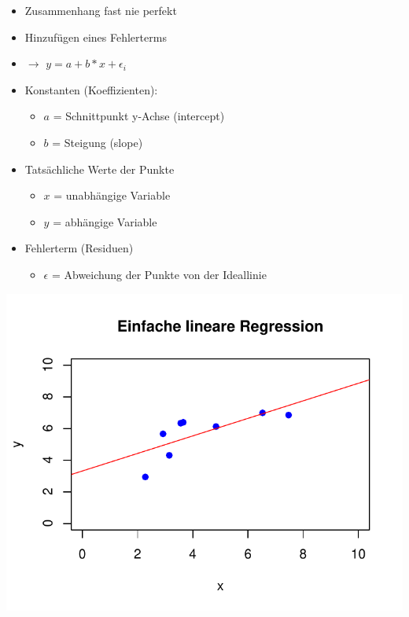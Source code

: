 \documentclass[aspectratio=169, journal, x11names, unknownkeysallowed, hyperref={colorlinks,
linkcolor = SS2,
urlcolor  = F3,
citecolor = F3,
anchorcolor = A4}, 12pt]{beamer}
\newcommand{\oarrow}{\textcolor{A1}{$\rightarrow$} }
\begin{document}
\begin{frame}[t]
  \begin{minipage}[t]{0.45\textwidth}
    \vspace{-11.5em}
    \begin{itemize}
      \item Zusammenhang fast nie perfekt
      \item Hinzufügen eines Fehlerterms
      \item[] \oarrow $y = a + b * x + \epsilon_i$
      \item Konstanten (Koeffizienten):  
      \begin{itemize}
        \item $a$ = Schnittpunkt y-Achse (intercept)
        \item $b$ = Steigung (slope) 
      \end{itemize}
      \item Tatsächliche Werte der Punkte
      \begin{itemize}
        \item $x$ = unabhängige Variable
        \item $y$ = abhängige Variable
      \end{itemize} 
      \item Fehlerterm (Residuen)
      \begin{itemize}
        \item $\epsilon$ = Abweichung der Punkte von der Ideallinie
      \end{itemize} 
    \end{itemize}
\end{minipage}%
\begin{minipage}[t]{0.45\textwidth}
  \centering
  \includegraphics[scale=0.5]{../Plots/reg_lin_3.pdf}
\end{minipage}
\end{frame}
\end{document}
